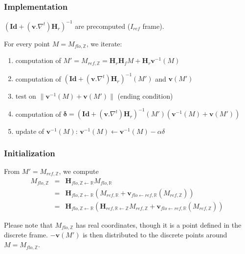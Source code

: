 \subsubsection{Implementation}

$\left(
\mathbf{Id} + (\mathbf{v}.\nabla^t) \mathbf{H}_r
\right)^{-1}$ are precomputed ($I_{ref}$ frame).

For every point $M = M_{flo,\mathbb{Z}}$, we iterate:
\begin{enumerate}
\itemsep -0.5ex
\item computation of 
$M' = M_{ref,\mathbb{Z}} =
\mathbf{H}_r \mathbf{H}_f M + \mathbf{H}_r \mathbf{v}^{-1}(M)$
\item computation of 
$\left(
\mathbf{Id} + (\mathbf{v}.\nabla^t) \mathbf{H}_r
\right)^{-1} (M')$ and $\mathbf{v}( M' )$
\item test on 
$\| \mathbf{v}^{-1}(M) + \mathbf{v}( M' ) \|$ (ending condition)
\item computation of 
$\mathbf{\delta} = 
\left(
\mathbf{Id} + (\mathbf{v}.\nabla^t)\mathbf{H}_r
\right)^{-1} (M')
\left( \mathbf{v}^{-1}(M) + \mathbf{v}( M' ) \right)$
\item update of $\mathbf{v}^{-1}(M)$:
$\mathbf{v}^{-1}(M) \leftarrow \mathbf{v}^{-1}(M) - \alpha \delta$
\end{enumerate}


\subsubsection{Initialization}

From $M' = M_{ref,\mathbb{Z}}$, we compute 
\begin{eqnarray*}
M_{flo,\mathbb{Z}} 
& = & \mathbf{H}_{flo,\mathbb{Z} \leftarrow \mathbb{R}}   
M_{flo,\mathbb{R}} \\
 & = & \mathbf{H}_{flo,\mathbb{Z} \leftarrow \mathbb{R}}  
 \left(
 M_{ref,\mathbb{R}} 
+ \mathbf{v}_{flo \leftarrow ref, \mathbb{R}}(M_{ref,\mathbb{Z}} )
\right) \\
 & = & \mathbf{H}_{flo,\mathbb{Z} \leftarrow \mathbb{R}}  
 \left(
 \mathbf{H}_{ref,\mathbb{R} \leftarrow \mathbb{Z}}
 M_{ref,\mathbb{Z}} 
+ \mathbf{v}_{flo \leftarrow ref, \mathbb{R}}(M_{ref,\mathbb{Z}} )
\right)
\end{eqnarray*}

Please note that $M_{flo,\mathbb{Z}}$ has real coordinates, though it is a point defined in the discrete frame. $-\mathbf{v}( M' )$ is then distributed to the discrete points around  $M=M_{flo,\mathbb{Z}}$.



